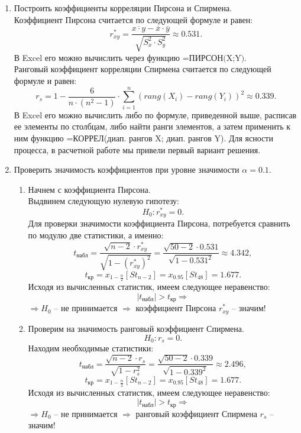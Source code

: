 \documentclass[12pt, letterpaper, twoside]{article}
\begin{document}
	\begin{enumerate}
		\item Построить коэффициенты корреляции Пирсона и Спирмена.\\
		Коэффициент Пирсона считается по следующей формуле и равен: $$r_{xy}^* = \frac{\overline{x \cdot y}-\overline{x} \cdot \overline{y}}{\sqrt{S_x^2 \cdot S_y^2}} \approx 0.531.$$
		В Excel его можно вычислить через функцию =$\text{ПИРСОН(X;Y)}$.\\
		Ранговый коэффициент корреляции Спирмена считается по следующей формуле и равен: $$r_s = 1 - \frac{6}{n \cdot (n^2 - 1)} \cdot \sum_{i=1}^n (rang(X_i) - rang (Y_i))^2 \approx 0.339.$$
		В Excel его можно вычислить либо по формуле, приведенной выше, расписав ее элементы по столбцам, либо найти ранги элементов, а затем применить к ним функцию =КОРРЕЛ(диап. рангов X; диап. рангов Y). Для ясности процесса, в расчетной работе мы привели первый вариант решения.
		\item Проверить значимость коэффициентов при уровне значимости $\alpha = 0.1$.\\
		\begin{enumerate}
			\item Начнем с коэффициента Пирсона.\\
			Выдвинем следующую нулевую гипотезу: $$H_0: r_{xy}^* = 0.$$
			Для проверки значимости коэффициента Пирсона, потребуется сравнить по модулю две статистики, а именно: 
			$$t_{\text{набл}} = \frac{\sqrt{n-2} \cdot r_{xy}^*}{\sqrt{1-(r_{xy}^*)^2}} = \frac{\sqrt{50-2} \cdot 0.531}{\sqrt{1-{0.531}^2}} \approx 4.342,$$ 
			$$t_{\text{кр}} = x_{1-\frac{\alpha}{2}}[St_{n-2}] = x_{0.95}[St_{48}] = 1.677.$$
			Исходя из вычисленных статистик, имеем следующее неравенство: 
			$$|t_{\text{набл}}| > t_{\text{кр}} \Rightarrow$$
			$\Rightarrow H_0$ -- не принимается $\Rightarrow$ коэффициент Пирсона $r_{xy}^*$ -- значим! 
			\item Проверим на значимость ранговый коэффициент Спирмена.\\
			$$H_0: r_s = 0.$$
			Находим необходимые статистики: 
			$$t_{\text{набл}} = \frac{\sqrt{n-2} \cdot r_s}{\sqrt{1-r_s^2}} = \frac{\sqrt{50-2} \cdot 0.339}{\sqrt{1-{0.339}^2}} \approx 2.496,$$ 
			$$t_{\text{кр}} = x_{1-\frac{\alpha}{2}}[St_{n-2}] = x_{0.95}[St_{48}] = 1.677.$$
			Исходя из вычисленных статистик, имеем следующее неравенство: 
			$$|t_{\text{набл}}| > t_{\text{кр}} \Rightarrow$$
			$\Rightarrow H_0$ -- не принимается $\Rightarrow$ ранговый коэффициент Спирмена $r_s$ -- значим! 
		\end{enumerate}

\end{enumerate}
\end{document}
